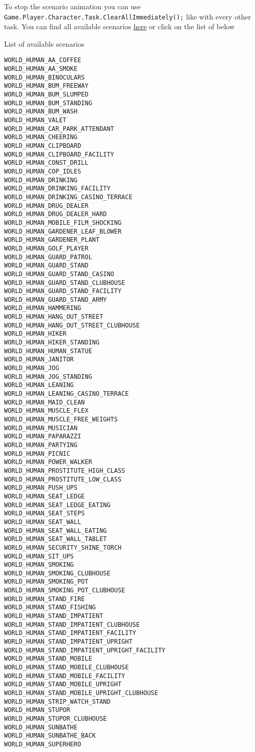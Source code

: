 \documentclass[
  openany]{book}
\begin{document}
To stop the scenario animation you can use \texttt{Game.Player.Character.Task.ClearAllImmediately();} like with every other task.
You can find all available scenarios \href{https://github.com/DioneB/gtav-scenarios}{here} or click on the list of below

List of available scenarios

\begin{verbatim}
WORLD_HUMAN_AA_COFFEE   
WORLD_HUMAN_AA_SMOKE    
WORLD_HUMAN_BINOCULARS   
WORLD_HUMAN_BUM_FREEWAY
WORLD_HUMAN_BUM_SLUMPED 
WORLD_HUMAN_BUM_STANDING
WORLD_HUMAN_BUM_WASH
WORLD_HUMAN_VALET
WORLD_HUMAN_CAR_PARK_ATTENDANT
WORLD_HUMAN_CHEERING
WORLD_HUMAN_CLIPBOARD
WORLD_HUMAN_CLIPBOARD_FACILITY
WORLD_HUMAN_CONST_DRILL
WORLD_HUMAN_COP_IDLES
WORLD_HUMAN_DRINKING
WORLD_HUMAN_DRINKING_FACILITY
WORLD_HUMAN_DRINKING_CASINO_TERRACE
WORLD_HUMAN_DRUG_DEALER
WORLD_HUMAN_DRUG_DEALER_HARD
WORLD_HUMAN_MOBILE_FILM_SHOCKING
WORLD_HUMAN_GARDENER_LEAF_BLOWER
WORLD_HUMAN_GARDENER_PLANT
WORLD_HUMAN_GOLF_PLAYER
WORLD_HUMAN_GUARD_PATROL
WORLD_HUMAN_GUARD_STAND
WORLD_HUMAN_GUARD_STAND_CASINO
WORLD_HUMAN_GUARD_STAND_CLUBHOUSE
WORLD_HUMAN_GUARD_STAND_FACILITY
WORLD_HUMAN_GUARD_STAND_ARMY
WORLD_HUMAN_HAMMERING
WORLD_HUMAN_HANG_OUT_STREET
WORLD_HUMAN_HANG_OUT_STREET_CLUBHOUSE
WORLD_HUMAN_HIKER
WORLD_HUMAN_HIKER_STANDING
WORLD_HUMAN_HUMAN_STATUE
WORLD_HUMAN_JANITOR
WORLD_HUMAN_JOG
WORLD_HUMAN_JOG_STANDING
WORLD_HUMAN_LEANING
WORLD_HUMAN_LEANING_CASINO_TERRACE
WORLD_HUMAN_MAID_CLEAN
WORLD_HUMAN_MUSCLE_FLEX
WORLD_HUMAN_MUSCLE_FREE_WEIGHTS
WORLD_HUMAN_MUSICIAN
WORLD_HUMAN_PAPARAZZI
WORLD_HUMAN_PARTYING
WORLD_HUMAN_PICNIC
WORLD_HUMAN_POWER_WALKER
WORLD_HUMAN_PROSTITUTE_HIGH_CLASS
WORLD_HUMAN_PROSTITUTE_LOW_CLASS
WORLD_HUMAN_PUSH_UPS
WORLD_HUMAN_SEAT_LEDGE
WORLD_HUMAN_SEAT_LEDGE_EATING
WORLD_HUMAN_SEAT_STEPS
WORLD_HUMAN_SEAT_WALL
WORLD_HUMAN_SEAT_WALL_EATING
WORLD_HUMAN_SEAT_WALL_TABLET
WORLD_HUMAN_SECURITY_SHINE_TORCH
WORLD_HUMAN_SIT_UPS
WORLD_HUMAN_SMOKING
WORLD_HUMAN_SMOKING_CLUBHOUSE
WORLD_HUMAN_SMOKING_POT
WORLD_HUMAN_SMOKING_POT_CLUBHOUSE
WORLD_HUMAN_STAND_FIRE
WORLD_HUMAN_STAND_FISHING
WORLD_HUMAN_STAND_IMPATIENT
WORLD_HUMAN_STAND_IMPATIENT_CLUBHOUSE
WORLD_HUMAN_STAND_IMPATIENT_FACILITY
WORLD_HUMAN_STAND_IMPATIENT_UPRIGHT
WORLD_HUMAN_STAND_IMPATIENT_UPRIGHT_FACILITY
WORLD_HUMAN_STAND_MOBILE
WORLD_HUMAN_STAND_MOBILE_CLUBHOUSE
WORLD_HUMAN_STAND_MOBILE_FACILITY
WORLD_HUMAN_STAND_MOBILE_UPRIGHT
WORLD_HUMAN_STAND_MOBILE_UPRIGHT_CLUBHOUSE
WORLD_HUMAN_STRIP_WATCH_STAND
WORLD_HUMAN_STUPOR
WORLD_HUMAN_STUPOR_CLUBHOUSE
WORLD_HUMAN_SUNBATHE
WORLD_HUMAN_SUNBATHE_BACK
WORLD_HUMAN_SUPERHERO

\end{verbatim}
\end{document}
